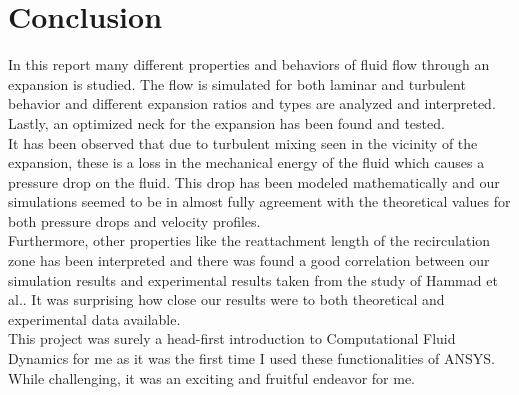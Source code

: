 \section{Conclusion}

In this report many different properties and behaviors of fluid flow through an expansion is studied. The flow is simulated for both laminar and turbulent behavior and different expansion ratios and types are analyzed and interpreted. Lastly, an optimized neck for the expansion has been found and tested.\\

\noindent It has been observed that due to turbulent mixing seen in the vicinity of the expansion, these is a loss in the mechanical energy of the fluid which causes a pressure drop on the fluid. This drop has been modeled mathematically and our simulations seemed to be in almost fully agreement with the theoretical values for both pressure drops and velocity profiles.\\

\noindent Furthermore, other properties like the reattachment length of the recirculation zone has been interpreted and there was found a good correlation between our simulation results and experimental results taken from the study of Hammad et al.\cite{hammad_ötügen_arik_1999}. It was surprising how close our results were to both theoretical and experimental data available. \\

\noindent This project was surely a head-first introduction to Computational Fluid Dynamics for me as it was the first time I used these functionalities of ANSYS. While challenging, it was an exciting and fruitful endeavor for me.